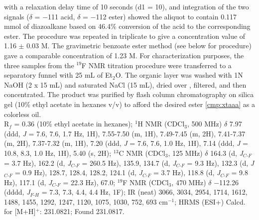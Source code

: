 with a relaxation delay time of 10 seconds (d1 = 10), and integration of the two signals ($\delta$ = $-$111
acid, $\delta$ = $-$112 ester) showed the aliquot to contain 0.117 mmol of
diazoalkane based on 46.4\% conversion of the acid to the corresponding ester.
The procedure was repeated in triplicate to give a concentration value of 1.16
$\pm$ 0.03 M. The gravimetric benzoate ester method (see below for procedure)
gave a comparable concentration of 1.23 M. For characterization purposes, the
three samples from the $^{19}$F NMR titration procedure were transferred to a separatory funnel with 25 mL of Et$_2$O. The organic layer was washed with 1N NaOH (2 x 15 mL) and saturated NaCl (15 mL), dried over
, filtered, and then concentrated. The product was purified by flash
column chromatography on silica gel (10\% ethyl acetate in hexanes v/v) to
afford the desired ester \ref{cmp:xtaaa} as a colorless oil.\\
\noindent R$_f$ = 0.36 (10\% ethyl acetate in hexanes); $^1$H NMR (CDCl$_3$, 500
MHz) $\delta$ 7.97 (ddd, \textit{J} =  7.6, 7.6, 1.7 Hz, 1H), 7.55-7.50 (m, 1H), 7.49-7.45
(m, 2H), 7.41-7.37 (m, 2H), 7.37-7.32 (m, 1H), 7.20 (ddd, \textit{J} =  7.6, 7.6, 1.0 Hz,
1H), 7.14 (ddd, \textit{J} =  10.8, 8.3, 1.0 Hz, 1H), 5.40 (s, 2H); $^{13}$C NMR
(CDCl$_3$, 125 MHz) $\delta$ 164.3 (d, \textit{J}$_{C\mbox{-}F}$ = 3.7 Hz), 162.2 (d, \textit{J}$_{C\mbox{-}F}$ = 260.5
Hz), 135.9, 134.7 (d, \textit{J}$_{C\mbox{-}F}$ = 9.3 Hz), 132.3 (d, \textit{J}$_{C\mbox{-}F}$ = 0.9 Hz), 128.7, 128.4,
128.2, 124.1 (d, \textit{J}$_{C\mbox{-}F}$ = 3.7 Hz), 118.8 (d, \textit{J}$_{C\mbox{-}F}$ = 9.8 Hz), 117.1 (d, \textit{J}$_{C\mbox{-}F}$ = 22.3
Hz), 67.0; $^{19}$F NMR (CDCl$_3$, 470 MHz) $\delta$ $-$112.26 (dddd,
\textit{J}$_{F\mbox{-}H}$ = 7.3, 7.3, 4.4, 4.4 Hz, 1F); IR (neat) 3066, 3034,
2954, 1714, 1612, 1488, 1455, 1292, 1247, 1120, 1075, 1030, 752, 693 cm$^{-1}$; HRMS (ESI+) Calcd. for
 [M+H]$^+$: 231.0821; Found 231.0817.
